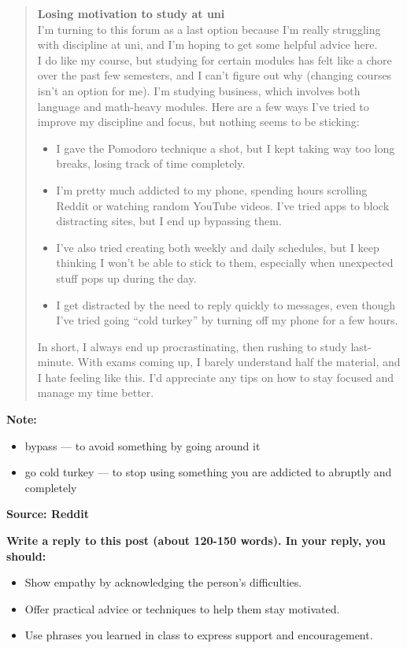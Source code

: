 \documentclass[a4paper,12pt]{article}
\begin{document}
\begin{quote}
\textbf{Losing motivation to study at uni}\\
I'm turning to this forum as a last option because I'm really struggling with discipline at uni, and I'm hoping to get some helpful advice here.\\
I do like my course, but studying for certain modules has felt like a chore over the past few semesters, and I can't figure out why (changing courses isn't an option for me). I'm studying business, which involves both language and math-heavy modules. Here are a few ways I've tried to improve my discipline and focus, but nothing seems to be sticking:
\begin{itemize}
    \item I gave the Pomodoro technique a shot, but I kept taking way too long breaks, losing track of time completely.
    \item I'm pretty much addicted to my phone, spending hours scrolling Reddit or watching random YouTube videos. I’ve tried apps to block distracting sites, but I end up bypassing them.
    \item I’ve also tried creating both weekly and daily schedules, but I keep thinking I won’t be able to stick to them, especially when unexpected stuff pops up during the day.
    \item I get distracted by the need to reply quickly to messages, even though I’ve tried going “cold turkey” by turning off my phone for a few hours.
\end{itemize}
In short, I always end up procrastinating, then rushing to study last-minute. With exams coming up, I barely understand half the material, and I hate feeling like this. I’d appreciate any tips on how to stay focused and manage my time better.
\end{quote}

\textbf{Note:}
\begin{itemize}
    \item bypass — to avoid something by going around it
    \item go cold turkey — to stop using something you are addicted to abruptly and completely
\end{itemize}

\textbf{Source: Reddit}

\vspace{1cm}

\textbf{Write a reply to this post (about 120-150 words). In your reply, you should:}
\begin{itemize}
    \item Show empathy by acknowledging the person’s difficulties.
    \item Offer practical advice or techniques to help them stay motivated.
    \item Use phrases you learned in class to express support and encouragement.
\end{itemize}
\end{document}
